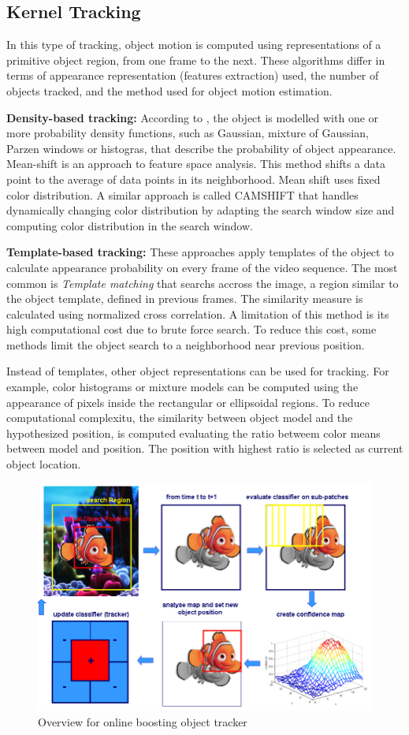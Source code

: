 \subsection{Kernel Tracking}

In this type of tracking, object motion is computed using representations of a primitive object region, from one frame to the next. These algorithms differ in terms of appearance representation (features extraction) used, the number of objects tracked, and the method used for object motion estimation. 

\textbf{Density-based tracking:} According to \cite{Cheng1995}, the object is modelled with one or more probability density functions, such as Gaussian, mixture of Gaussian, Parzen windows or histogras, that describe the probability of object appearance. Mean-shift is an approach to feature space analysis. This method shifts a data point to the average of data points in its neighborhood. Mean shift uses fixed color distribution. A similar approach is called CAMSHIFT \cite{Exner2010} that handles dynamically changing color distribution by adapting the search window size and computing color distribution in the search window.

\textbf{Template-based tracking:}  These approaches apply templates of the object to calculate appearance probability on every frame of the video sequence. The most common is \textit{Template matching} \cite{Korman2013} that searchs accross the image, a region similar to the object template, defined in previous frames. The similarity measure is calculated using normalized cross correlation. A limitation of this method is its high computational cost due to brute force search. To reduce this cost, some methods limit the object search to a neighborhood near previous position.

Instead of templates, other object representations can be used for tracking. For example, color histograms or mixture models can be computed using the appearance of pixels inside the rectangular or ellipsoidal regions. To reduce computational complexitu, the similarity between object model and the hypothesized position, is computed evaluating the ratio betweem color means between model and position. The position with highest ratio is selected as current object location.

\begin{figure}[t]
	\centering
		\includegraphics[width=0.7\linewidth]{Figures/overview_boost.png}
	\caption{Overview for online boosting object tracker}
	\label{fig::overview_boost}
\end{figure}	

